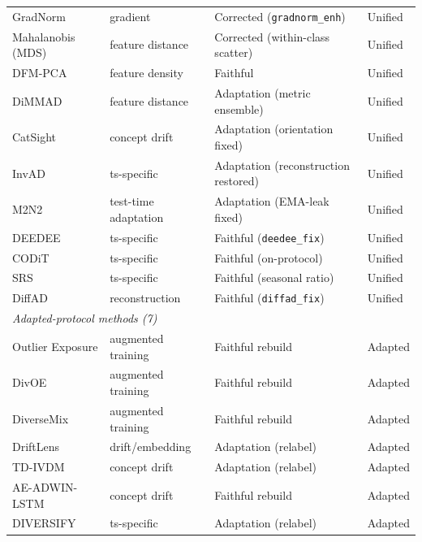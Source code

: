 \begin{table}[h]
\begin{tabular}{lll l}
GradNorm & gradient & Corrected (\texttt{gradnorm\_enh}) & Unified \\
Mahalanobis (MDS) & feature distance & Corrected (within-class scatter) & Unified \\
DFM-PCA & feature density & Faithful & Unified \\
DiMMAD & feature distance & Adaptation (metric ensemble) & Unified \\
CatSight & concept drift & Adaptation (orientation fixed) & Unified \\
InvAD & ts-specific & Adaptation (reconstruction restored) & Unified \\
M2N2 & test-time adaptation & Adaptation (EMA-leak fixed) & Unified \\
DEEDEE & ts-specific & Faithful (\texttt{deedee\_fix}) & Unified \\
CODiT & ts-specific & Faithful (on-protocol) & Unified \\
SRS & ts-specific & Faithful (seasonal ratio) & Unified \\
DiffAD & reconstruction & Faithful (\texttt{diffad\_fix}) & Unified \\
\midrule
\multicolumn{4}{l}{\emph{Adapted-protocol methods (7)}} \\
\midrule
Outlier Exposure & augmented training & Faithful rebuild & Adapted \\
DivOE & augmented training & Faithful rebuild & Adapted \\
DiverseMix & augmented training & Faithful rebuild & Adapted \\
DriftLens & drift/embedding & Adaptation (relabel) & Adapted \\
TD-IVDM & concept drift & Adaptation (relabel) & Adapted \\
AE-ADWIN-LSTM & concept drift & Faithful rebuild & Adapted \\
DIVERSIFY & ts-specific & Adaptation (relabel) & Adapted \\
\bottomrule
\end{tabular}
\end{table}

